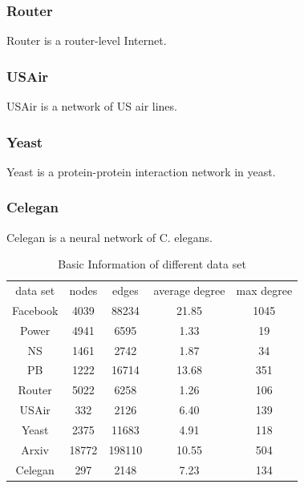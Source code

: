 \documentclass[12pt]{article}
\begin{document}
\subsubsection{Router}
Router is a router-level Internet.\cite{router}
\subsubsection{USAir}
USAir is a network of US air lines. \cite{usair}
\subsubsection{Yeast}
Yeast is a protein-protein interaction network in yeast.\cite{yeast}

\subsubsection{Celegan}
Celegan is a neural network of C. elegans.\cite{small_world}

\begin{table}
	\begin{center}
		\begin{tabular}{|c|c|c|c|c|}
			\hline
			data set & nodes & edges & average degree & max degree \\
			Facebook & 4039 & 88234 & 21.85 & 1045 \\
			Power & 4941 & 6595 & 1.33 & 19 \\
			NS & 1461 & 2742 & 1.87 & 34 \\
			PB & 1222 & 16714 & 13.68 & 351 \\
			Router & 5022 & 6258 & 1.26 & 106 \\
			USAir & 332 & 2126 & 6.40 & 139 \\
			Yeast & 2375 & 11683 & 4.91 & 118 \\
			Arxiv & 18772 & 198110 & 10.55 & 504 \\
			Celegan & 297 & 2148 & 7.23 & 134 \\
			\hline 
		\end{tabular}
		\caption{Basic Information of different data set}
		\label{tab:info}
	\end{center}
\end{table}
\end{document}
